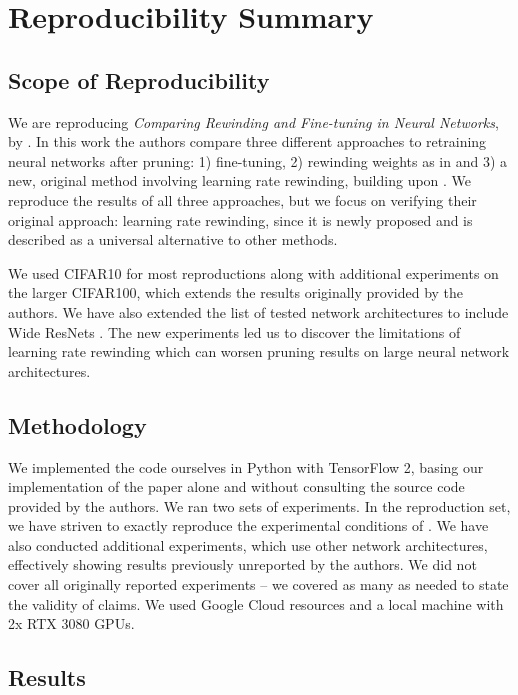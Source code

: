 \section{Reproducibility Summary}

\subsection*{Scope of Reproducibility}
    
We are reproducing \emph{Comparing Rewinding and Fine-tuning in Neural Networks}, by \cite{Renda}.
In this work the authors compare three different approaches to retraining neural networks after pruning: 1) fine-tuning, 2) rewinding weights as in \cite{Frankle} and 3) a new, original method involving learning rate rewinding, building upon \cite{Frankle}. We reproduce the results of all three approaches, but we focus on verifying their original approach: learning rate rewinding, since it is newly proposed and is described as a universal alternative to other methods.

We used CIFAR10 for most reproductions along with additional experiments on the larger CIFAR100, which extends the results originally provided by the authors. We have also extended the list of tested network architectures to include Wide ResNets \cite{wrn}. The new experiments led us to discover the limitations of learning rate rewinding which can worsen pruning results on large neural network architectures.

\subsection*{Methodology}

We implemented the code ourselves in Python with TensorFlow 2, basing our implementation of the paper alone and without consulting the source code provided by the authors. We ran two sets of experiments. In the reproduction set, we have striven to exactly reproduce the experimental conditions of \cite{Renda}. We have also conducted additional experiments, which use other network architectures, effectively showing results previously unreported by the authors. We did not cover all originally reported experiments -- we covered as many as needed to state the validity of claims. We used Google Cloud resources and a local machine with 2x RTX 3080 GPUs.

\subsection*{Results}

